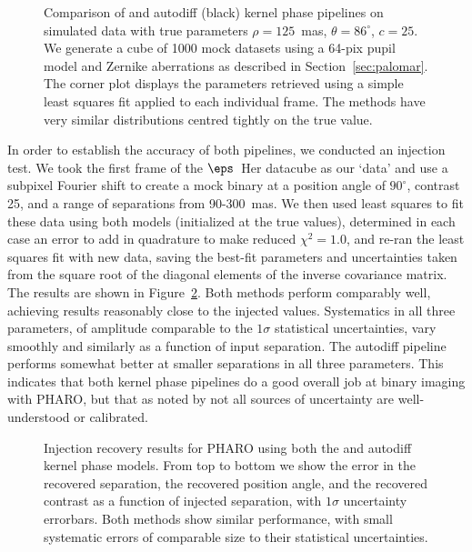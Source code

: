\documentclass[modern]{aastex63}
\begin{document}
\begin{figure}
\caption{Comparison of \citet[][blue linetype]{martinache20} and autodiff (black) kernel phase pipelines on simulated data with true parameters $\rho = 125$~mas, $\theta = 86^\circ$, $c=25$. We generate a cube of 1000 mock datasets using a 64-pix pupil model and Zernike aberrations as described in Section~\ref{sec:palomar}. The corner plot displays the parameters retrieved using a simple least squares fit applied to each individual frame. The methods have very similar distributions centred tightly on the true value. \href{https://github.com/benjaminpope/morphine/blob/stable/notebooks/frantz_test_sim_cube.ipynb}{\color{linkcolor}\faGithub}
\label{comparison_posterior_sim_cube}}
\end{figure}

In order to establish the accuracy of both pipelines, we conducted an injection test. We took the first frame of the $\eps$~Her datacube as our `data' and use a subpixel Fourier shift to create a mock binary at a position angle of $90^\circ$, contrast 25, and a range of separations from 90-300~mas. We then used least squares to fit these data using both models (initialized at the true values), determined in each case an error to add in quadrature to make reduced $\chi^2=1.0$, and re-ran the least squares fit with new data, saving the best-fit parameters and uncertainties taken from the square root of the diagonal elements of the inverse covariance matrix. The results are shown in Figure~\ref{injection_recovery}. Both methods perform comparably well, achieving results reasonably close to the injected values. Systematics in all three parameters, of amplitude comparable to the $1\sigma$ statistical uncertainties, vary smoothly and similarly as a function of input separation. The autodiff pipeline performs somewhat better at smaller separations in all three parameters. This indicates that both kernel phase pipelines do a good overall job at binary imaging with PHARO, but that as noted by \citet{martinache20} not all sources of uncertainty are well-understood or calibrated.

\begin{figure}
     \caption{Injection recovery results for PHARO using both the \citet{martinache20} and autodiff kernel phase models. From top to bottom we show the error in the recovered separation, the recovered position angle, and the recovered contrast as a function of injected separation, with $1\sigma$ uncertainty errorbars. Both methods show similar performance, with small systematic errors of comparable size to their statistical uncertainties. \href{https://github.com/benjaminpope/morphine/blob/stable/notebooks/frantz_test.ipynb}{\color{linkcolor}\faGithub}}
    \label{injection_recovery}
\end{figure}
\end{document}
